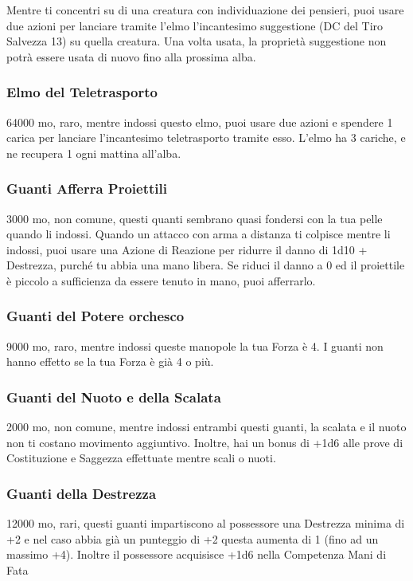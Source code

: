 \begin{multicols}{2}
Mentre ti concentri su di una creatura con individuazione dei pensieri, puoi usare due azioni per lanciare tramite l'elmo l'incantesimo suggestione (DC del Tiro Salvezza 13) su quella creatura. Una volta usata, la proprietà suggestione non potrà essere usata di nuovo fino alla prossima alba.

\subsubsection*{Elmo del Teletrasporto}
64000 mo, raro, mentre indossi questo elmo, puoi usare due azioni e spendere 1 carica per lanciare l'incantesimo teletrasporto tramite esso. L'elmo ha 3 cariche, e ne recupera 1 ogni mattina all'alba.

\subsubsection*{Guanti Afferra Proiettili}
3000 mo, non comune, questi quanti sembrano quasi fondersi con la tua pelle quando li indossi. Quando un attacco con arma a distanza ti colpisce mentre li indossi, puoi usare una Azione di Reazione per ridurre il danno di 1d10 + Destrezza, purché tu abbia una mano libera. Se riduci il danno a 0 ed il proiettile è piccolo a sufficienza da essere tenuto in mano, puoi afferrarlo.

\subsubsection*{Guanti del Potere orchesco}
9000 mo, raro, mentre indossi queste manopole la tua Forza è 4. I guanti non hanno effetto se la tua Forza è già 4 o più.

\subsubsection*{Guanti del Nuoto e della Scalata}
2000 mo, non comune, mentre indossi entrambi questi guanti, la scalata e il nuoto non ti costano movimento aggiuntivo. Inoltre, hai un bonus di +1d6 alle prove di Costituzione e Saggezza effettuate mentre scali o nuoti.

\subsubsection*{Guanti della Destrezza}
12000 mo, rari, questi guanti impartiscono al possessore una Destrezza minima di +2 e nel caso abbia già un punteggio di +2 questa aumenta di 1 (fino ad un massimo +4). Inoltre il possessore acquisisce +1d6 nella Competenza Mani di Fata


\end{multicols}

